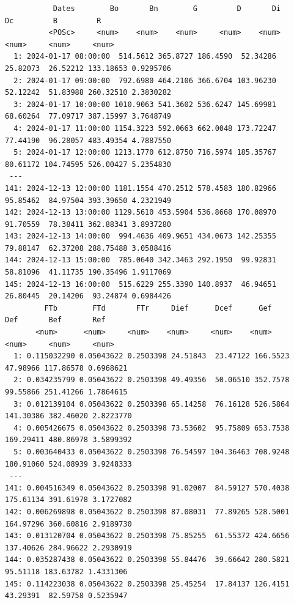 \begin{itemize}
\begin{verbatim}
		   Dates        Bo       Bn        G         D       Di        Dc         B         R
		  <POSc>     <num>    <num>    <num>     <num>    <num>     <num>     <num>     <num>
  1: 2024-01-17 08:00:00  514.5612 365.8727 186.4590  52.34286 25.82073  26.52212 133.18653 0.9295706
  2: 2024-01-17 09:00:00  792.6980 464.2106 366.6704 103.96230 52.12242  51.83988 260.32510 2.3830282
  3: 2024-01-17 10:00:00 1010.9063 541.3602 536.6247 145.69981 68.60264  77.09717 387.15997 3.7648749
  4: 2024-01-17 11:00:00 1154.3223 592.0663 662.0048 173.72247 77.44190  96.28057 483.49354 4.7887550
  5: 2024-01-17 12:00:00 1213.1770 612.8750 716.5974 185.35767 80.61172 104.74595 526.00427 5.2354830
 ---                                                                                                 
141: 2024-12-13 12:00:00 1181.1554 470.2512 578.4583 180.82966 95.85462  84.97504 393.39650 4.2321949
142: 2024-12-13 13:00:00 1129.5610 453.5904 536.8668 170.08970 91.70559  78.38411 362.88341 3.8937280
143: 2024-12-13 14:00:00  994.4636 409.9651 434.0673 142.25355 79.88147  62.37208 288.75488 3.0588416
144: 2024-12-13 15:00:00  785.0640 342.3463 292.1950  99.92831 58.81096  41.11735 190.35496 1.9117069
145: 2024-12-13 16:00:00  515.6229 255.3390 140.8937  46.94651 26.80445  20.14206  93.24874 0.6984426
	     FTb        FTd       FTr     Dief      Dcef      Gef       Def       Bef       Ref
	   <num>      <num>     <num>    <num>     <num>    <num>     <num>     <num>     <num>
  1: 0.115032290 0.05043622 0.2503398 24.51843  23.47122 166.5523  47.98966 117.86578 0.6968621
  2: 0.034235799 0.05043622 0.2503398 49.49356  50.06510 352.7578  99.55866 251.41266 1.7864615
  3: 0.012139104 0.05043622 0.2503398 65.14258  76.16128 526.5864 141.30386 382.46020 2.8223770
  4: 0.005426675 0.05043622 0.2503398 73.53602  95.75809 653.7538 169.29411 480.86978 3.5899392
  5: 0.003640433 0.05043622 0.2503398 76.54597 104.36463 708.9248 180.91060 524.08939 3.9248333
 ---                                                                                           
141: 0.004516349 0.05043622 0.2503398 91.02007  84.59127 570.4038 175.61134 391.61978 3.1727082
142: 0.006269898 0.05043622 0.2503398 87.08031  77.89265 528.5001 164.97296 360.60816 2.9189730
143: 0.013120704 0.05043622 0.2503398 75.85255  61.55372 424.6656 137.40626 284.96622 2.2930919
144: 0.035287438 0.05043622 0.2503398 55.84476  39.66642 280.5821  95.51118 183.63782 1.4331306
145: 0.114223038 0.05043622 0.2503398 25.45254  17.84137 126.4151  43.29391  82.59758 0.5235947
\end{verbatim}


\end{itemize}
